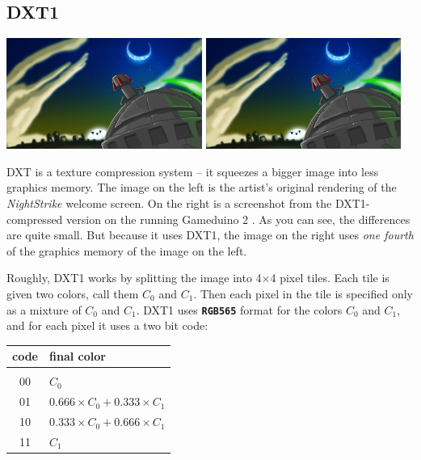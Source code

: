 \documentclass[10pt]{book}
\newcommand{\gdtwo}{Gameduino 2 }
\newcommand{\mach}[1]{\texttt{\textbf{#1}}}
\begin{document}
\begin{CJK}{UTF8}{gkai}
\newpage
\section{DXT1}
\label{dxt1}

\begin{center}
\includegraphics[width=0.48\textwidth]{assets/nightstrike/backgrounds/welcome.jpg}
\includegraphics[width=0.48\textwidth]{assets/dxt1.png}
\end{center}

DXT is a texture compression system -- it squeezes a bigger image into less graphics memory.
The image on the left is the artist's original rendering of the \textit{NightStrike} welcome screen. On the right is a screenshot
from the DXT1-compressed version on the running \gdtwo. As you can see, the differences are quite small.
But because it uses DXT1,
the image on the right uses \textit{one fourth} of the graphics memory of the image on the left.

Roughly, DXT1 works by splitting the image into 4$\times$4 pixel tiles. Each tile is given two colors, call them
$C_0$ and $C_1$. Then each pixel in the tile is specified only as a mixture of $C_0$ and $C_1$.
DXT1 uses \mach{RGB565} format for the colors $C_0$ and $C_1$, and for each pixel it uses a two bit code:

\vspace{10pt}
\begin{tabular}{cl}
code & final color \\
\hline \\
00 & $C_0$ \\
01 & $0.666 \times C_0 + 0.333 \times C_1$ \\
10 & $0.333 \times C_0 + 0.666 \times C_1$ \\
11 & $C_1$ \\
\end{tabular}
\vspace{10pt}


\end{CJK}
\end{document}
